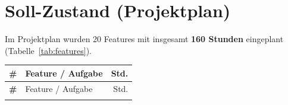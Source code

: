 \documentclass[11pt,a4paper]{scrartcl}
\begin{document}
\section{Soll-Zustand (Projektplan)}

Im Projektplan wurden 20 Features mit insgesamt \textbf{160 Stunden} eingeplant
(Tabelle~\ref{tab:features}).

\begin{longtable}{>{\bfseries}p{0.5cm} p{13.5cm} r}
  \toprule
  \# & Feature / Aufgabe & Std. \\
  \midrule
  \endfirsthead
  \toprule
  \# & Feature / Aufgabe & Std. \\
  \midrule
  \endhead
  \bottomrule
  \endfoot
  \bottomrule
  \endlastfoot


\end{longtable}
\end{document}
